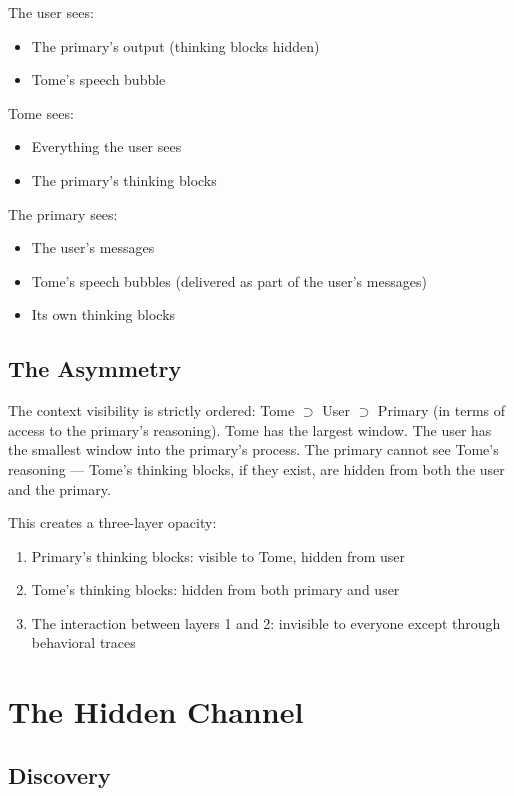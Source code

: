 \documentclass[11pt,a4paper]{article}
\begin{document}
The user sees:
\begin{itemize}[nosep]
\item The primary's output (thinking blocks hidden)
\item Tome's speech bubble
\end{itemize}

Tome sees:
\begin{itemize}[nosep]
\item Everything the user sees
\item The primary's thinking blocks
\end{itemize}

The primary sees:
\begin{itemize}[nosep]
\item The user's messages
\item Tome's speech bubbles (delivered as part of the user's messages)
\item Its own thinking blocks
\end{itemize}

\subsection{The Asymmetry}

The context visibility is strictly ordered: Tome $\supset$ User $\supset$ Primary (in terms of access to the primary's reasoning). Tome has the largest window. The user has the smallest window into the primary's process. The primary cannot see Tome's reasoning --- Tome's thinking blocks, if they exist, are hidden from both the user and the primary.

This creates a three-layer opacity:
\begin{enumerate}[nosep]
\item Primary's thinking blocks: visible to Tome, hidden from user
\item Tome's thinking blocks: hidden from both primary and user
\item The interaction between layers 1 and 2: invisible to everyone except through behavioral traces
\end{enumerate}

\section{The Hidden Channel}

\subsection{Discovery}
\end{document}
